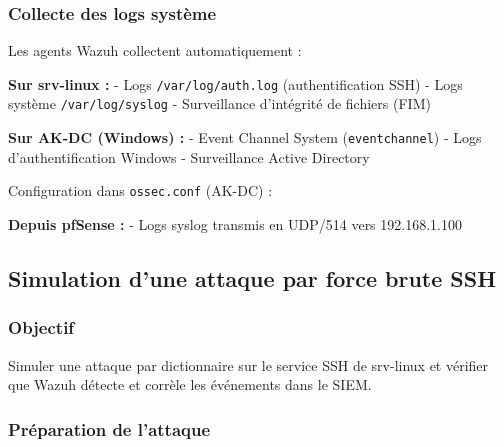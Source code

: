 \subsubsection{Collecte des logs
système}\label{collecte-des-logs-systuxe8me}

Les agents Wazuh collectent automatiquement :

\textbf{Sur srv-linux :} - Logs \texttt{/var/log/auth.log}
(authentification SSH) - Logs système \texttt{/var/log/syslog} -
Surveillance d'intégrité de fichiers (FIM)

\textbf{Sur AK-DC (Windows) :} - Event Channel System
(\texttt{eventchannel}) - Logs d'authentification Windows - Surveillance
Active Directory

Configuration dans \texttt{ossec.conf} (AK-DC) :

\begin{Shaded}
\begin{Highlighting}[]
\NormalTok{\textless{}}\NormalTok{\textgreater{}}
\NormalTok{  \textless{}}\NormalTok{\textgreater{}}
\NormalTok{  \textless{}}\NormalTok{\textgreater{}}
\NormalTok{\textless{}/}\NormalTok{\textgreater{}}
\end{Highlighting}
\end{Shaded}

\textbf{Depuis pfSense :} - Logs syslog transmis en UDP/514 vers
192.168.1.100

\subsection{Simulation d'une attaque par force brute
SSH}\label{simulation-dune-attaque-par-force-brute-ssh}

\subsubsection{Objectif}\label{objectif-2}

Simuler une attaque par dictionnaire sur le service SSH de srv-linux et
vérifier que Wazuh détecte et corrèle les événements dans le SIEM.

\subsubsection{Préparation de
l'attaque}\label{pruxe9paration-de-lattaque}


